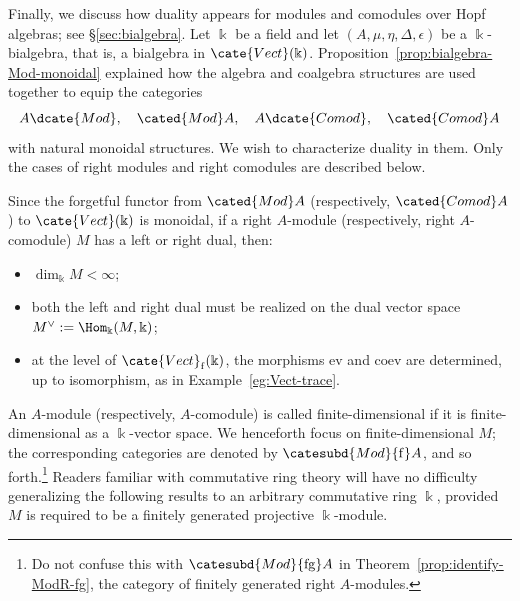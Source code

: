 
Finally, we discuss how duality appears for modules and comodules over Hopf
algebras; see \S\ref{sec:bialgebra}. Let $\Bbbk$ be a field and let
$(A,\mu,\eta,\Delta,\epsilon)$ be a $\Bbbk$-bialgebra, that is, a bialgebra
in $\cate{Vect}(\Bbbk)$. Proposition~\ref{prop:bialgebra-Mod-monoidal}
explained how the algebra and coalgebra structures are used together to equip
the categories
\[ A\dcate{Mod}, \quad \cated{Mod}A, \quad A\dcate{Comod}, \quad \cated{Comod}A \]
with natural monoidal structures. We wish to characterize duality in them.
Only the cases of right modules and right comodules are described below.

Since the forgetful functor from $\cated{Mod}A$ (respectively,
$\cated{Comod}A$) to $\cate{Vect}(\Bbbk)$ is monoidal, if a right $A$-module
(respectively, right $A$-comodule) $M$ has a left or right dual, then:
\begin{itemize}
	\item $\dim_{\Bbbk}M<\infty$;
	\item both the left and right dual must be realized on the dual vector
	space $M^\vee:=\Hom_{\Bbbk}(M,\Bbbk)$;
	\item at the level of $\cate{Vect}_{\mathrm f}(\Bbbk)$, the morphisms
	$\mathrm{ev}$ and $\mathrm{coev}$ are determined, up to isomorphism, as in
	Example~\ref{eg:Vect-trace}.
\end{itemize}

An $A$-module (respectively, $A$-comodule) is called finite-dimensional if
it is finite-dimensional as a $\Bbbk$-vector space. We henceforth focus on
finite-dimensional $M$; the corresponding categories are denoted by
$\catesubd{Mod}{\mathrm f}A$, and so forth.\footnote{Do not confuse this
with $\catesubd{Mod}{\mathrm{fg}}A$ in
Theorem~\ref{prop:identify-ModR-fg}, the category of finitely generated right
$A$-modules.} Readers familiar with commutative ring theory will have no
difficulty generalizing the following results to an arbitrary commutative
ring $\Bbbk$, provided $M$ is required to be a finitely generated projective
$\Bbbk$-module.

